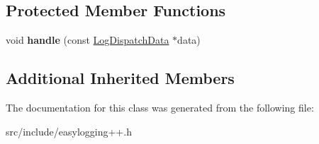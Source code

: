 \subsection*{Protected Member Functions}
\begin{DoxyCompactItemize}
\item 
\mbox{\label{classel_1_1base_1_1_default_log_dispatch_callback_acdac30f202c245500e6d94c55eee6d95}} 
void {\bfseries handle} (const \hyperlink{classel_1_1_log_dispatch_data}{Log\+Dispatch\+Data} $\ast$data)
\end{DoxyCompactItemize}
\subsection*{Additional Inherited Members}


The documentation for this class was generated from the following file\+:\begin{DoxyCompactItemize}
\item 
src/include/easylogging++.\+h\end{DoxyCompactItemize}
